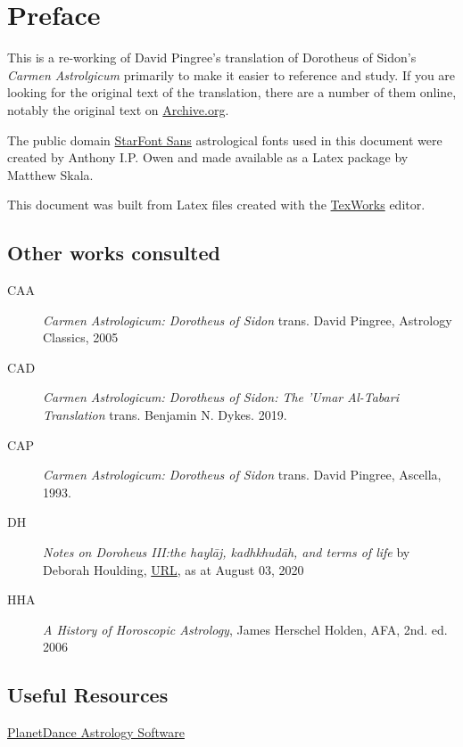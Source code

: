 \chapter{Preface}
This is a re-working of David Pingree's translation of Dorotheus of Sidon's \textsl{Carmen Astrolgicum} primarily to make it easier to reference and study. If you are looking for the original text of the translation, there are a number of them online, notably the original text on \href{https://archive.org/details/PingreeDS1976}{Archive.org}.

The public domain \href{https://www.ctan.org/pkg/starfont}{StarFont Sans} astrological fonts used in this document were created by Anthony I.P. Owen and made available as a Latex package by Matthew Skala. 

This document was built from Latex files created with the \href{https://www.tug.org/texworks/}{TexWorks} editor.

\section{Other works consulted}
\begin{description}
\item[CAA]
	\textsl{Carmen Astrologicum: Dorotheus of Sidon} trans. David Pingree, Astrology Classics, 2005

\item[CAD]
	\textsl{Carmen Astrologicum: Dorotheus of Sidon: The 'Umar Al-Tabari Translation} trans. Benjamin N. Dykes. 2019.

\item[CAP]
	\textsl{Carmen Astrologicum: Dorotheus of Sidon} trans. David Pingree, Ascella, 1993.
	
\item[DH]
	\textsl{Notes on Doroheus III:the haylāj, kadhkhudāh, and terms of life} by Deborah Houlding, \href{https://www.skyscript.co.uk/dorotheus3notes.pdf}{URL}, as at August 03, 2020
	
\item[HHA]
	\textsl{A History of Horoscopic Astrology}, James Herschel Holden, AFA, 2nd. ed. 2006
\end{description}

\section{Useful Resources}

\noindent\href{https://www.jcremers.com/}{PlanetDance Astrology Software}

